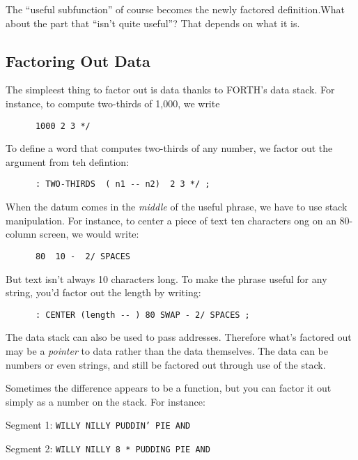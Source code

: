 \documentclass{book}
\begin{document}
\noindent
The ``useful subfunction'' of course becomes the newly factored definition.What about the part that ``isn't quite useful''? That depends on what it is.

\subsection*{
	\textbf{Factoring Out Data}}

\noindent
The simpleest thing to factor out is data thanks to FORTH's data stack. For instance, to compute two-thirds of 1,000, we write

\begin{verbatim}
      1000 2 3 */
\end{verbatim}

\noindent
To define a word that computes two-thirds of any number, we factor out the argument from teh defintion:

\begin{verbatim}
      : TWO-THIRDS  ( n1 -- n2)  2 3 */ ;
\end{verbatim}

\noindent
When the datum comes in the \textit{middle} of the useful phrase, we have to use stack manipulation. For instance, to center a piece of text ten characters ong on an 80-column screen, we would write:

\begin{verbatim}
      80  10 -  2/ SPACES
\end{verbatim}

\noindent
But text isn't always 10 characters long. To make the phrase useful for any string, you'd factor out the length by writing:

\begin{verbatim}
      : CENTER (length -- ) 80 SWAP - 2/ SPACES ;
\end{verbatim}

\noindent
The data stack can also be used to pass addresses. Therefore what's factored out may be a \textit{pointer} to data rather than the data themselves. The data can be numbers or even strings, and still be factored out through use of the stack.
	
Sometimes the difference appears to be a function, but you can factor it out simply as a number on the stack. For instance:

\bigskip

Segment 1:	\texttt{WILLY NILLY  PUDDIN' PIE AND}

Segment 2:	\texttt{WILLY NILLY  8 * PUDDING PIE AND}
\end{document}
